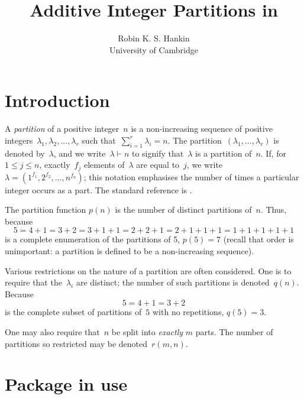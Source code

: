 \documentclass[nojss]{jss}
\author{Robin K. S. Hankin\\University of Cambridge}
\title{Additive Integer Partitions in \proglang{R}}
\begin{document}
\newsymbol{}

\section{Introduction}
A {\em partition} of a positive integer~$n$ is a non-increasing
sequence of positive integers~$\lambda_1,\lambda_2,\ldots,\lambda_r$
such that~$\sum_{i=1}^r\lambda_i=n$.  The
partition~$\left(\lambda_1,\ldots,\lambda_r\right)$ is denoted
by~$\lambda$, and we write~$\lambda\vdash n$ to signify that~$\lambda$
is a partition of~$n$.  If, for~$1\leqslant j\leqslant n$,
exactly~$f_j$ elements of~$\lambda$ are equal to~$j$, we
write~$\lambda=\left(1^{f_1},2^{f_2},\ldots,n^{f_n}\right)$; this
notation emphasises the number of times a particular integer occurs as
a part.  The standard reference is \citet{andrews1998}.

The partition function $p(n)$ is the number of distinct partitions
of~$n$.  Thus, because
\[
5=4+1=3+2=3+1+1=2+2+1=2+1+1+1=1+1+1+1+1\] is a complete enumeration of
the partitions of 5, $p(5)=7$ (recall that order is unimportant: a
partition is defined to be a non-increasing sequence).

Various restrictions on the nature of a partition are often
considered.  One is to require that the~$\lambda_i$ are distinct; the
number of such partitions is denoted~$q(n)$.  Because
\[5=4+1=3+2\] is the complete subset of partitions of~$5$ with no
repetitions, $q(5)=3$.  

One may also require that~$n$ be split into {\em exactly} $m$ parts.
The number of partitions so restricted may be denoted~$r(m,n)$.

\section[Package partitions in use]{Package  in use}
\end{document}
